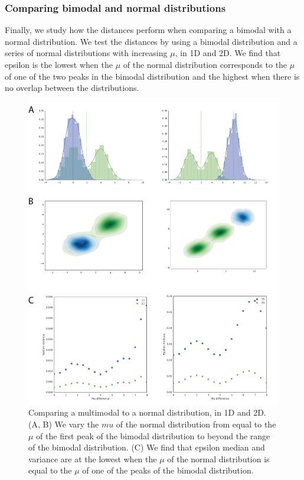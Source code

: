  \subsubsection{Comparing bimodal and normal distributions}
Finally, we study how the distances perform when comparing a bimodal with a normal distribution. We test the distances by using a bimodal distribution and a series of normal distributions with increasing $\mu$, in 1D and 2D. We find that epsilon is the lowest when the $\mu$ of the normal distribution corresponds to the $\mu$ of one of the two peaks in the bimodal distribution and the highest when there is no overlap between the distributions. 


\begin{figure}[htbp]
\centering
\includegraphics[scale=0.6]{chapterABCFlow/images/multimodal_v_normal.png}
\caption[LoF caption]{Comparing a multimodal to a normal distribution, in 1D and 2D. (A, B) We vary the $mu$ of the normal distribution from equal to the $\mu$ of the first peak of the bimodal distribution to beyond the range of the bimodal distribution. (C) We find that epsilon median and variance are at the lowest when the $\mu$ of the normal distribution is equal to the $\mu$ of one of the peaks of the bimodal distribution. }
\label{fig:multimodal_v_normal}
\end{figure}



